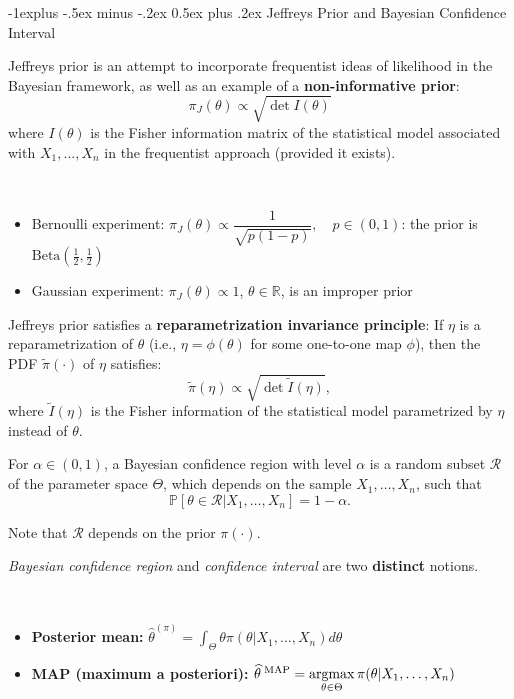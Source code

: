 \documentclass[a4paper, 10pt,landscape]{article}
\makeatletter
\DeclareMathOperator*{\argmax}{argmax}
\renewcommand{\subsection}{\@startsection{subsection}{2}{0mm}%
                                {-1explus -.5ex minus -.2ex}%
                                {0.5ex plus .2ex}%
                                {\normalfont\normalsize\bfseries}}
\makeatother
\begin{document}
\begin{multicols*}{3}
\subsection{Jeffreys Prior and Bayesian Confidence Interval}

\begin{description}
	\item Jeffreys prior is an attempt to incorporate frequentist ideas of likelihood in the Bayesian framework, as well as an example of a {\bf non-informative prior}:
	$$\pi_J(\theta)\propto\sqrt{\det I(\theta)}$$
	where $I(\theta)$ is the Fisher information matrix of the statistical model associated with $X_1,\dots,X_n$ in the frequentist approach (provided it exists).
	\item[Examples] ~
	\begin{itemize}[topsep=0pt]
		\item Bernoulli experiment: $\pi_J(\theta)\propto\dfrac{1}{\sqrt{p(1-p)}},\quad p\in(0,1)$: the prior is $\text{Beta}(\frac{1}{2},\frac{1}{2})$
		\item Gaussian experiment: $\pi_J(\theta)\propto1$, $\theta\in\mathbb{R}$, is an improper prior
	\end{itemize}
	\item Jeffreys prior satisfies a {\bf reparametrization invariance principle}: If $\eta$ is a reparametrization of $\theta$ (i.e., $\eta=\phi(\theta)$ for some one-to-one map $\phi$), then the PDF $\tilde{\pi}(\cdot)$ of $\eta$ satisfies:
	$$\tilde{\pi}(\eta)\propto\sqrt{\det\tilde{I}(\eta)},$$
	where $\tilde{I}(\eta)$ is the Fisher information of the statistical model parametrized by $\eta$ instead of $\theta$.
	\item[Bayesian confidence regions] For $\alpha\in(0,1)$, a Bayesian confidence region with level $\alpha$ is a random subset $\mathcal{R}$ of the parameter space $\Theta$, which depends on the sample $X_1,\dots,X_n$, such that
	$$\mathbb{P}\left[\theta\in\mathcal{R}|X_1,\dots,X_n\right]=1-\alpha.$$
	\item Note that $\mathcal{R}$ depends on the prior $\pi(\cdot).$
	\item {\it Bayesian confidence region} and {\it confidence interval} are two {\bf distinct} notions.
	\item[Bayesian estimation] ~
	\begin{itemize}
		\item {\bf Posterior mean:} $\widehat{\theta}^{(\pi)}=\int_{\Theta}\theta\pi\left(\theta|X_1,\dots,X_n\right)d\theta$
		\item {\bf MAP (maximum a posteriori):} $\widehat{\theta}^\text{\;MAP}=\argmax\limits_{\theta\in\Theta}\pi(\theta|X_1,\dots,X_n)$
		

\end{itemize}
\end{description}
\end{multicols*}
\end{document}

